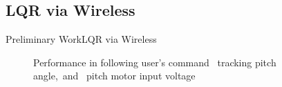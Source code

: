 \documentclass{beamer}
\begin{document}

\subsection{LQR via Wireless}

\begin{frame}{Preliminary Work}{LQR via Wireless} %
    \begin{figure}
      \centering
      \caption{Performance in following user's command~ tracking pitch angle,~and~ pitch motor input voltage}
      \label{fig:performancePitchConst}
    \end{figure}
\end{frame}
\end{document}
